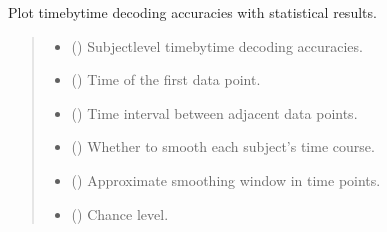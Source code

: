 \documentclass[letterpaper,10pt,english]{sphinxhowto}
\begin{document}
\begin{fulllineitems}
\sphinxAtStartPar
Plot time\sphinxhyphen{}by\sphinxhyphen{}time decoding accuracies with statistical results.
\begin{quote}\begin{description}
\begin{itemize}
\item {} 
\sphinxAtStartPar
{} (\sphinxstyleliteralemphasis{\sphinxupquote{, }}\sphinxstyleliteralemphasis{\sphinxupquote{ {[}}}\sphinxstyleliteralemphasis{\sphinxupquote{, }}\sphinxstyleliteralemphasis{\sphinxupquote{{]}}}) \textendash{} Subject\sphinxhyphen{}level time\sphinxhyphen{}by\sphinxhyphen{}time decoding accuracies.

\item {} 
\sphinxAtStartPar
{} (\sphinxstyleliteralemphasis{\sphinxupquote{, }}) \textendash{} Time of the first data point.

\item {} 
\sphinxAtStartPar
{} (\sphinxstyleliteralemphasis{\sphinxupquote{, }}) \textendash{} Time interval between adjacent data points.

\item {} 
\sphinxAtStartPar
{} (\sphinxstyleliteralemphasis{\sphinxupquote{, }}) \textendash{} Whether to smooth each subject’s time course.

\item {} 
\sphinxAtStartPar
{} (\sphinxstyleliteralemphasis{\sphinxupquote{, }}) \textendash{} Approximate smoothing window in time points.

\item {} 
\sphinxAtStartPar
{} (\sphinxstyleliteralemphasis{\sphinxupquote{, }}) \textendash{} Chance level.


\end{itemize}
\end{description}
\end{quote}
\end{fulllineitems}
\end{document}
